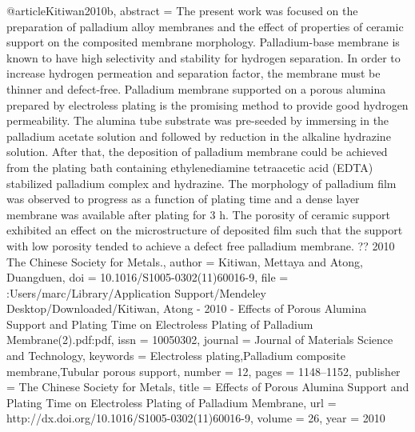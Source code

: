 @article{Kitiwan2010b,
abstract = {The present work was focused on the preparation of palladium alloy membranes and the effect of properties of ceramic support on the composited membrane morphology. Palladium-base membrane is known to have high selectivity and stability for hydrogen separation. In order to increase hydrogen permeation and separation factor, the membrane must be thinner and defect-free. Palladium membrane supported on a porous alumina prepared by electroless plating is the promising method to provide good hydrogen permeability. The alumina tube substrate was pre-seeded by immersing in the palladium acetate solution and followed by reduction in the alkaline hydrazine solution. After that, the deposition of palladium membrane could be achieved from the plating bath containing ethylenediamine tetraacetic acid (EDTA) stabilized palladium complex and hydrazine. The morphology of palladium film was observed to progress as a function of plating time and a dense layer membrane was available after plating for 3 h. The porosity of ceramic support exhibited an effect on the microstructure of deposited film such that the support with low porosity tended to achieve a defect free palladium membrane. ?? 2010 The Chinese Society for Metals.},
author = {Kitiwan, Mettaya and Atong, Duangduen},
doi = {10.1016/S1005-0302(11)60016-9},
file = {:Users/marc/Library/Application Support/Mendeley Desktop/Downloaded/Kitiwan, Atong - 2010 - Effects of Porous Alumina Support and Plating Time on Electroless Plating of Palladium Membrane(2).pdf:pdf},
issn = {10050302},
journal = {Journal of Materials Science and Technology},
keywords = {Electroless plating,Palladium composite membrane,Tubular porous support},
number = {12},
pages = {1148--1152},
publisher = {The Chinese Society for Metals},
title = {{Effects of Porous Alumina Support and Plating Time on Electroless Plating of Palladium Membrane}},
url = {http://dx.doi.org/10.1016/S1005-0302(11)60016-9},
volume = {26},
year = {2010}
}
